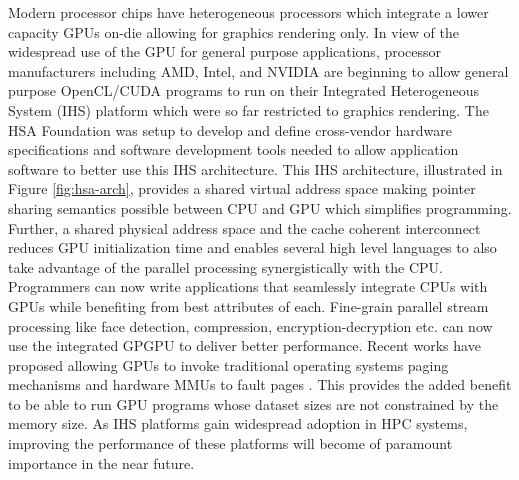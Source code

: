 \par Modern processor chips have heterogeneous processors which integrate a lower capacity GPUs on-die allowing for graphics rendering only. In view of the widespread use of the GPU for general purpose applications, processor manufacturers including AMD\cite{amd-apu}, Intel\cite{inteliris}, and NVIDIA\cite{denver} are beginning to allow general purpose OpenCL\cite{opencl}/CUDA\cite{cuda} programs to run on their Integrated Heterogeneous System (IHS) platform which were so far restricted to graphics rendering. The HSA Foundation \cite{hsafoundation} was setup to develop and define cross-vendor hardware specifications and software development tools needed to allow application software to better use this IHS architecture. This IHS architecture, illustrated in Figure \ref{fig:hsa-arch}, provides a shared virtual address space making pointer sharing semantics possible between CPU and GPU which simplifies programming. Further, a shared physical address space and the cache coherent interconnect reduces GPU initialization time and enables several high level languages \cite{sumatra,julia} to also take advantage of the parallel processing synergistically with the CPU. Programmers can now write applications that seamlessly integrate CPUs with GPUs while benefiting from best attributes of each. Fine-grain parallel stream processing like face detection, compression, encryption-decryption etc. can now use the integrated GPGPU to deliver better performance. Recent works have proposed allowing GPUs to invoke traditional operating systems paging mechanisms and hardware MMUs to fault pages \cite{tlb-translation}. This provides the added benefit to be able to run GPU programs whose dataset sizes are not constrained by the memory size. As IHS platforms gain widespread adoption in HPC systems, improving the performance of these platforms will become of paramount importance in the near future. \cite{apu-exascale,amd-exascale1}

